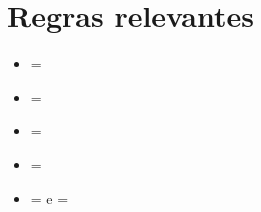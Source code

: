 \section{Regras relevantes}
\begin{itemize}
  \item { = }
  \item { = }
  \item { = }
  \item { = }
  \item { =  e  = }
\end{itemize}












































